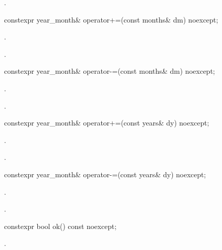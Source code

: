\begin{itemdescr}
\pnum
\returns {}.
\end{itemdescr}

%
\begin{itemdecl}
constexpr year_month& operator+=(const months& dm) noexcept;
\end{itemdecl}

\begin{itemdescr}
\pnum
\effects {}.

\pnum
\returns {}.
\end{itemdescr}

%
\begin{itemdecl}
constexpr year_month& operator-=(const months& dm) noexcept;
\end{itemdecl}

\begin{itemdescr}
\pnum
\effects {}.

\pnum
\returns {}.
\end{itemdescr}

%
\begin{itemdecl}
constexpr year_month& operator+=(const years& dy) noexcept;
\end{itemdecl}

\begin{itemdescr}
\pnum
\effects {}.

\pnum
\returns {}.
\end{itemdescr}

%
\begin{itemdecl}
constexpr year_month& operator-=(const years& dy) noexcept;
\end{itemdecl}

\begin{itemdescr}
\pnum
\effects {}.

\pnum
\returns {}.
\end{itemdescr}

%
\begin{itemdecl}
constexpr bool ok() const noexcept;
\end{itemdecl}

\begin{itemdescr}
\pnum
\returns {}.
\end{itemdescr}

